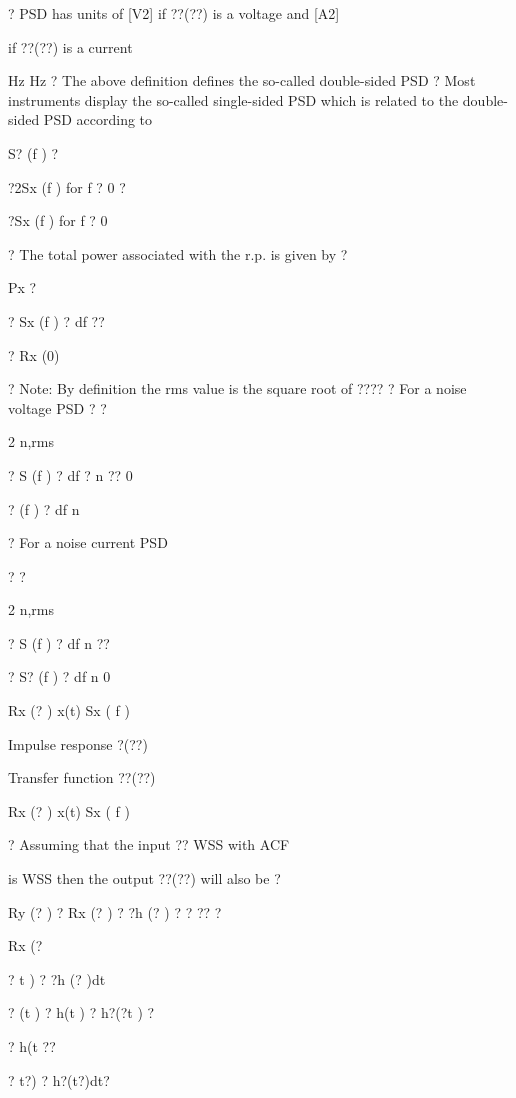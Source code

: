 \documentclass[2pt,landscape]{article}
\begin{document}
\begin{multicols*}{5}
?	PSD has units of [V2] if ??(??) is a voltage and [A2]



if ??(??) is a current


Hz	Hz
?	The above definition defines the so-called double-sided PSD
?	Most instruments display the so-called single-sided PSD which is related to the 
double-sided PSD according to



S? (f ) ?


?2Sx (f )	for f ? 0
?


?Sx (f )	for f ? 0



?	The total power associated with the r.p. is given by
?


Px ?


? Sx (f ) ? df
??


? Rx (0)



?	Note: By definition the rms value is the square root of ????
?	For a noise voltage PSD
?	?


2
n,rms


?	S (f ) ? df ?
n
??	0


?	(f ) ? df
n



?	For a noise current PSD


?	?


2
n,rms


?	S (f ) ? df
n
??


?	S? (f ) ? df
n
0





Rx (? )
x(t)
Sx ( f )


Impulse response ?(??)



Transfer function ??(??)


Rx (? )
x(t)
Sx ( f )






?	Assuming that the input ??
WSS with ACF


is WSS then the output ??(??) 
will also be
?


Ry (? ) ? Rx (? ) ? ?h (? ) ? ?
??
?


Rx (?


? t ) ? ?h (? )dt


? (t ) ? h(t ) ? h?(?t ) ?


? h(t
??


? t?) ? h?(t?)dt?




\end{multicols*}
\end{document}
